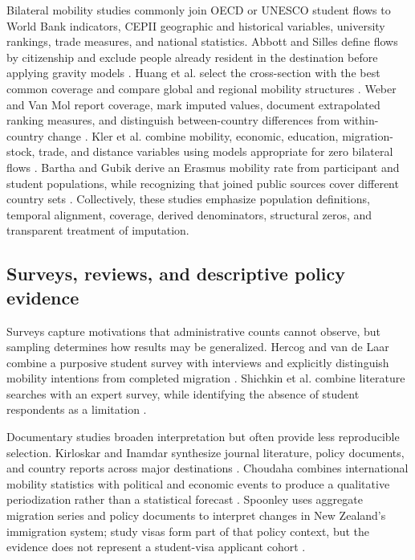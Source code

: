 \documentclass[runningheads]{llncs}
\begin{document}
Bilateral mobility studies commonly join OECD or UNESCO student flows to World Bank indicators, CEPII geographic and historical variables, university rankings, trade measures, and national statistics. Abbott and Silles define flows by citizenship and exclude people already resident in the destination before applying gravity models \cite{abbott2016}. Huang et al. select the cross-section with the best common coverage and compare global and regional mobility structures \cite{huang2023}. Weber and Van Mol report coverage, mark imputed values, document extrapolated ranking measures, and distinguish between-country differences from within-country change \cite{weber2023}. Kler et al. combine mobility, economic, education, migration-stock, trade, and distance variables using models appropriate for zero bilateral flows \cite{kler2023}. Bartha and Gubik derive an Erasmus mobility rate from participant and student populations, while recognizing that joined public sources cover different country sets \cite{bartha2018}. Collectively, these studies emphasize population definitions, temporal alignment, coverage, derived denominators, structural zeros, and transparent treatment of imputation.

\subsection{Surveys, reviews, and descriptive policy evidence}

Surveys capture motivations that administrative counts cannot observe, but sampling determines how results may be generalized. Hercog and van de Laar combine a purposive student survey with interviews and explicitly distinguish mobility intentions from completed migration \cite{hercog2017}. Shichkin et al. combine literature searches with an expert survey, while identifying the absence of student respondents as a limitation \cite{shichkin2025}.

Documentary studies broaden interpretation but often provide less reproducible selection. Kirloskar and Inamdar synthesize journal literature, policy documents, and country reports across major destinations \cite{kirloskar2021}. Choudaha combines international mobility statistics with political and economic events to produce a qualitative periodization rather than a statistical forecast \cite{choudaha2017}. Spoonley uses aggregate migration series and policy documents to interpret changes in New Zealand's immigration system; study visas form part of that policy context, but the evidence does not represent a student-visa applicant cohort \cite{spoonley2025}.
\end{document}
